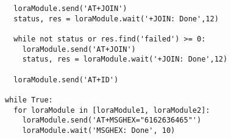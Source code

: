 \begin{verbatim}
  loraModule.send('AT+JOIN')
  status, res = loraModule.wait('+JOIN: Done',12)
  
  while not status or res.find('failed') >= 0:
    loraModule.send('AT+JOIN')
    status, res = loraModule.wait('+JOIN: Done',12)

  loraModule.send('AT+ID')

while True:
  for loraModule in [loraModule1, loraModule2]:
    loraModule.send('AT+MSGHEX="6162636465"')
    loraModule.wait('MSGHEX: Done', 10)

\end{verbatim}